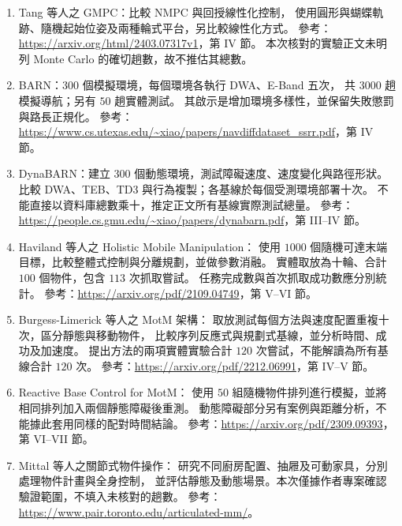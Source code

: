 \begin{enumerate}
    \item Tang 等人之 GMPC：比較 NMPC 與回授線性化控制，
    使用圓形與蝴蝶軌跡、隨機起始位姿及兩種輪式平台，另比較線性化方式。
    參考：\url{https://arxiv.org/html/2403.07317v1}，第 IV 節。
    本次核對的實驗正文未明列 Monte Carlo 的確切趟數，故不推估其總數。

    \item BARN：$300$ 個模擬環境，每個環境各執行 DWA、E-Band 五次，
    共 $3000$ 趟模擬導航；另有 $50$ 趟實體測試。
    其啟示是增加環境多樣性，並保留失敗懲罰與路長正規化。
    參考：\url{https://www.cs.utexas.edu/~xiao/papers/navdiffdataset_ssrr.pdf}，第 IV 節。

    \item DynaBARN：建立 $300$ 個動態環境，測試障礙速度、速度變化與路徑形狀。
    比較 DWA、TEB、TD3 與行為複製；各基線於每個受測環境部署十次。
    不能直接以資料庫總數乘十，推定正文所有基線實際測試總量。
    參考：\url{https://people.cs.gmu.edu/~xiao/papers/dynabarn.pdf}，第 III--IV 節。

    \item Haviland 等人之 Holistic Mobile Manipulation：
    使用 $1000$ 個隨機可達末端目標，比較整體式控制與分離規劃，並做參數消融。
    實體取放為十輪、合計 $100$ 個物件，包含 $113$ 次抓取嘗試。
    任務完成數與首次抓取成功數應分別統計。
    參考：\url{https://arxiv.org/pdf/2109.04749}，第 V--VI 節。

    \item Burgess-Limerick 等人之 MotM 架構：
    取放測試每個方法與速度配置重複十次，區分靜態與移動物件，
    比較序列反應式與規劃式基線，並分析時間、成功及加速度。
    提出方法的兩項實體實驗合計 $120$ 次嘗試，不能解讀為所有基線合計 $120$ 次。
    參考：\url{https://arxiv.org/pdf/2212.06991}，第 IV--V 節。

    \item Reactive Base Control for MotM：
    使用 $50$ 組隨機物件排列進行模擬，並將相同排列加入兩個靜態障礙後重測。
    動態障礙部分另有案例與距離分析，不能據此套用同樣的配對時間結論。
    參考：\url{https://arxiv.org/pdf/2309.09393}，第 VI--VII 節。

    \item Mittal 等人之關節式物件操作：
    研究不同廚房配置、抽屜及可動家具，分別處理物件計畫與全身控制，
    並評估靜態及動態場景。本次僅據作者專案確認驗證範圍，不填入未核對的趟數。
    參考：\url{https://www.pair.toronto.edu/articulated-mm/}。
\end{enumerate}

